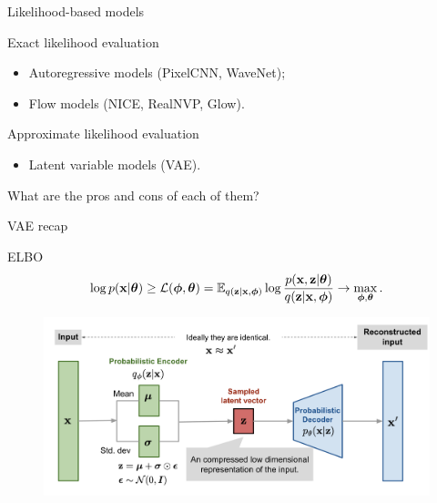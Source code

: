 \begin{frame}{Likelihood-based models}
\begin{block}{Exact likelihood evaluation}
	\begin{itemize}
		\item Autoregressive models (PixelCNN, WaveNet);
		\item Flow models (NICE, RealNVP, Glow).
	\end{itemize}
\end{block}
\begin{block}{Approximate likelihood evaluation}
	\begin{itemize}
		\item Latent variable models (VAE).
	\end{itemize}
\end{block}
What are the pros and cons of each of them? \\
\vspace{0.2cm}
\end{frame}
\begin{frame}{VAE recap}
\begin{block}{ELBO}
	\vspace{-0.3cm}
	\[
	\log p(\mathbf{x} | \boldsymbol{\theta}) \geq \mathcal{L} (\boldsymbol{\phi}, \boldsymbol{\theta})  = \mathbb{E}_{q(\mathbf{z} | \mathbf{x}, \boldsymbol{\phi})} \log \frac{p(\mathbf{x}, \mathbf{z} | \boldsymbol{\theta})}{q(\mathbf{z}| \mathbf{x}, \boldsymbol{\phi})} \rightarrow \max_{\boldsymbol{\phi}, \boldsymbol{\theta}}.
	\]
	\vspace{-0.5cm}
\end{block}
\begin{figure}[h]
	\centering
	\includegraphics[width=\linewidth]{figs/vae-gaussian.png}
\end{figure}

\end{frame}
